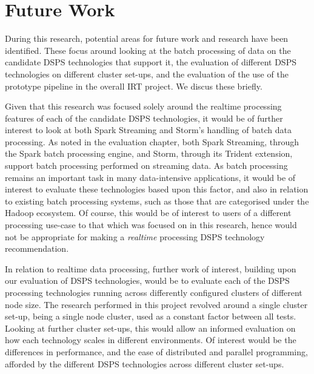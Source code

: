 

\section{Future Work} %
\label{sub:future_work}

During this research, potential areas for future work and research have been identified. These focus around looking at
the batch processing of data on the candidate DSPS technologies that support it, the evaluation of different DSPS technologies on different
cluster set-ups, and the evaluation of the use of the prototype pipeline in the overall IRT project. We discus these briefly.

Given that this research was focused solely around the realtime processing features of each of the candidate DSPS technologies,
it would be of further interest to look at both Spark Streaming and Storm's handling of batch data processing. As noted
in the evaluation chapter, both Spark Streaming, through the Spark batch processing engine, and Storm, through its
Trident extension, support batch processing performed on streaming data. As batch processing remains an important task
in many data-intensive applications, it would be of interest to evaluate these technologies based upon this factor, and also in relation
to existing batch processing systems, such as those that are categorised under the Hadoop ecosystem. Of course, this would
be of interest to users of a different processing use-case to that which was focused on in this research, hence would
not be appropriate for making a \textit{realtime} processing DSPS technology recommendation.

In relation to realtime data processing, further work of interest, building upon our evaluation of DSPS technologies, would
be to evaluate each of the DSPS processing technologies running across differently configured clusters of different node size.
The research performed in this project revolved around a single cluster set-up, being a single node cluster, used as a constant factor between all
tests. Looking at further cluster set-ups, this would allow an informed evaluation on how each technology scales in different environments.
Of interest would be the differences in performance, and the ease of distributed and parallel programming, afforded by the different DSPS technologies across
different cluster set-ups.

